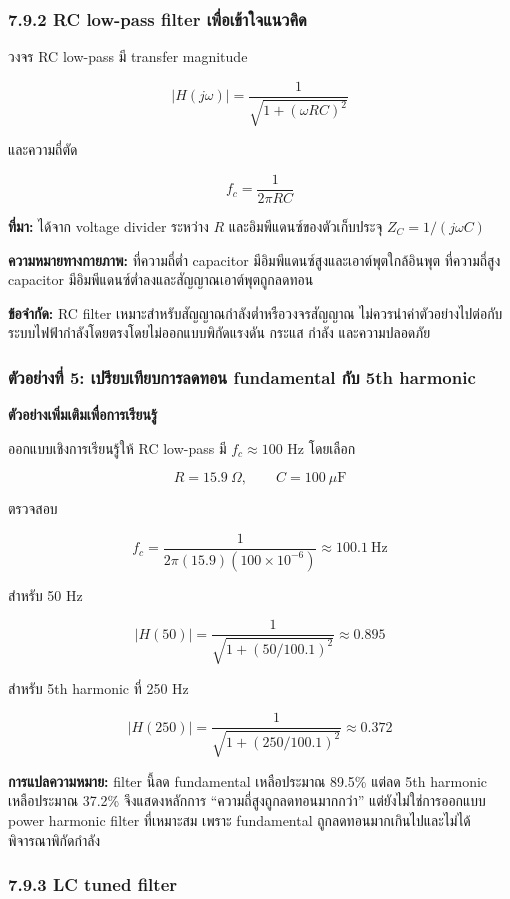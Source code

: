 \subsubsection{7.9.2 RC low-pass filter เพื่อเข้าใจแนวคิด}

วงจร RC low-pass มี transfer magnitude

\[
|H(j\omega)|=\frac{1}{\sqrt{1+(\omega RC)^2}}
\]

และความถี่ตัด

\[
f_c=\frac{1}{2\pi RC}
\]

\textbf{ที่มา:} ได้จาก voltage divider ระหว่าง $R$ และอิมพีแดนซ์ของตัวเก็บประจุ $Z_C=1/(j\omega C)$

\textbf{ความหมายทางกายภาพ:} ที่ความถี่ต่ำ capacitor มีอิมพีแดนซ์สูงและเอาต์พุตใกล้อินพุต ที่ความถี่สูง capacitor มีอิมพีแดนซ์ต่ำลงและสัญญาณเอาต์พุตถูกลดทอน

\textbf{ข้อจำกัด:} RC filter เหมาะสำหรับสัญญาณกำลังต่ำหรือวงจรสัญญาณ ไม่ควรนำค่าตัวอย่างไปต่อกับระบบไฟฟ้ากำลังโดยตรงโดยไม่ออกแบบพิกัดแรงดัน กระแส กำลัง และความปลอดภัย

\subsubsection{ตัวอย่างที่ 5: เปรียบเทียบการลดทอน fundamental กับ 5th harmonic}

\textbf{ตัวอย่างเพิ่มเติมเพื่อการเรียนรู้}

ออกแบบเชิงการเรียนรู้ให้ RC low-pass มี $f_c\approx100$ Hz โดยเลือก

\[
R=15.9\ \Omega,\qquad C=100\ \mu\mathrm{F}
\]

ตรวจสอบ

\[
f_c=\frac{1}{2\pi(15.9)(100\times10^{-6})}\approx100.1\ \text{Hz}
\]

สำหรับ 50 Hz

\[
|H(50)|=\frac{1}{\sqrt{1+(50/100.1)^2}}\approx0.895
\]

สำหรับ 5th harmonic ที่ 250 Hz

\[
|H(250)|=\frac{1}{\sqrt{1+(250/100.1)^2}}\approx0.372
\]

\textbf{การแปลความหมาย:} filter นี้ลด fundamental เหลือประมาณ 89.5\% แต่ลด 5th harmonic เหลือประมาณ 37.2\% จึงแสดงหลักการ “ความถี่สูงถูกลดทอนมากกว่า” แต่ยังไม่ใช่การออกแบบ power harmonic filter ที่เหมาะสม เพราะ fundamental ถูกลดทอนมากเกินไปและไม่ได้พิจารณาพิกัดกำลัง

\subsubsection{7.9.3 LC tuned filter}

